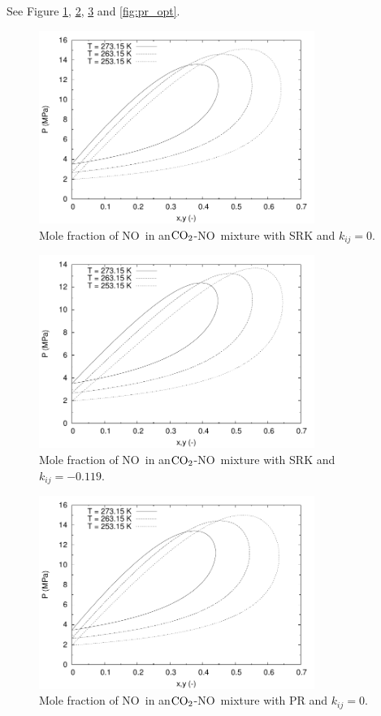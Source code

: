 \documentclass[english]{../thermomemo/thermomemo}
\newcommand{\coto}{\ensuremath{\text{CO}_{\text{\scriptsize 2}}}}
\newcommand{\no}{\ensuremath{\text{NO}}}
\begin{document}
See Figure \ref{fig:srk_0}, \ref{fig:srk_opt}, \ref{fig:pr_0} and \ref{fig:pr_opt}.
\begin{figure}[tbp]
  \centering
  \includegraphics[width=0.8\textwidth]{NO_SRK_Txy_k0.pdf}
  \caption{Mole fraction of \no~in an\coto-\no~mixture with SRK and $k_{ij}=0$.}
  \label{fig:srk_0}
\end{figure}

\begin{figure}[tbp]
  \centering
  \includegraphics[width=0.8\textwidth]{NO_SRK_Txy.pdf}
  \caption{Mole fraction of \no~in an\coto-\no~mixture with SRK and $k_{ij}=-0.119$.}
  \label{fig:srk_opt}
\end{figure}

\begin{figure}[tbp]
  \centering
  \includegraphics[width=0.8\textwidth]{NO_PR_Txy_k0.pdf}
  \caption{Mole fraction of \no~in an\coto-\no~mixture with PR and $k_{ij}=0$.}
  \label{fig:pr_0}
\end{figure}
\end{document}
